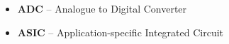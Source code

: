 \begin{itemize}
\item {\bf ADC}		-- Analogue to Digital Converter
\item {\bf ASIC}    -- Application-specific Integrated Circuit

\end{itemize}
